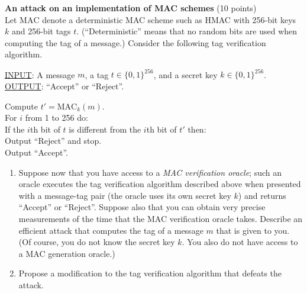 \begin{problem}{\bf An attack on an implementation of MAC schemes} (10 points)\\
Let $\mbox{MAC}$ denote a deterministic MAC scheme such as HMAC with
256-bit keys $k$ and 256-bit tags $t$. (``Deterministic'' means that no
random bits are used when computing the tag of a message.) Consider
the following tag verification algorithm.

\vspace*{3mm}
\noindent
\underline{INPUT}: A message $m$, a tag $t \in \{0,1\}^{256}$, and a
secret key $k \in \{0,1\}^{256}$.\\
\underline{OUTPUT}: ``Accept'' or ``Reject''.

\vspace*{1mm}
\noindent
Compute $t'=\mbox{MAC}_k(m)$.\\
For $i$ from 1 to 256 do:\\
\hspace*{10mm}If the $i$th bit of $t$ is different from the $i$th bit
of $t'$ then:\\
\hspace*{20mm}Output ``Reject'' and stop.\\
Output ``Accept''.

\vspace*{4mm}
\noindent
\begin{enumerate}[label=(\alph*)]
\item Suppose now that you have access to a \emph{MAC verification oracle};
such an oracle executes the tag verification algorithm described
above when presented with a message-tag pair (the oracle uses its own
secret key $k$) and returns ``Accept''
or ``Reject''. Suppose also that you can obtain very precise
measurements of the time that the MAC verification oracle takes.
Describe an efficient attack that computes the tag of a message $m$
that is given to you. (Of course, you do not know the secret key $k$.
You also do not have access to a MAC generation oracle.)
\item Propose a modification to the tag verification algorithm that
defeats the attack.
\end{enumerate}
\end{problem}

